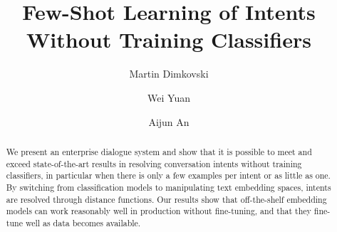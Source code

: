 \documentclass[sigconf, anonymous=true]{acmart}
\begin{document}
\title{Few-Shot Learning of Intents Without Training Classifiers}

\author{Martin Dimkovski}

\author{Wei Yuan}
\authornotemark[1]
\author{Aijun An}


\begin{abstract}
We present an enterprise dialogue system and show that it is possible to meet and exceed state-of-the-art results in resolving conversation intents without training classifiers, in particular when there is only a few examples per intent or as little as one. By switching from classification models to manipulating text embedding spaces, intents are resolved through distance functions. Our results show that off-the-shelf embedding models can work reasonably well in production without fine-tuning, and that they fine-tune well as data becomes available. 
\end{abstract}
\end{document}
